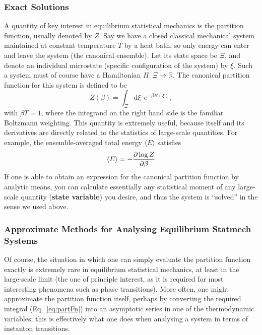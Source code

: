 \subsubsection{Exact Solutions}
A quantity of key interest in equilibrium statistical mechanics is the partition function, usually denoted by $Z$. Say we have a closed classical mechanical system maintained at constant temperature $T$ by a heat bath,
so only energy can enter and leave the system (the canonical ensemble). Let its state space be $\Xi$, and denote an individual microstate (specific configuration of the system) by $\xi$.
Such a system must of course have a Hamiltonian $H : \Xi \rightarrow \mathbb{R}$. The canonical partition function for this system is defined to be
\begin{equation} \label{eq:partFn}
 Z(\beta) = \int_\Xi  \! \! \mathrm{d}  \xi \  \  e^{- \beta H(\xi)},
\end{equation}
with $\beta T = 1$, where the integrand on the right hand side is the familiar Boltzmann weighting. This quantity is extremely useful, because itself and its derivatives are directly related to the statistics of large-scale quantities.
For example, the ensemble-averaged total energy $\langle E \rangle$ satisfies
\begin{equation}
 \langle E \rangle = - \frac{\partial \log{Z}}{\partial \beta}
\end{equation}
If one is able to obtain an expression for the canonical partition function by analytic means, you can calculate essentially any statistical moment of any large-scale quantity (\textbf{state variable})
you desire, and thus the system is ``solved'' in the sense we used above.



\subsubsection{Approximate Methods for Analysing Equilibrium Statmech Systems}
Of course, the situation in which one can simply evaluate the partition function exactly is
extremely rare in equilibrium statistical mechanics, at least in the large-scale limit (the one of
principle interest, as it is required for most interesting phenomena such as phase transitions).
More often, one might approximate the partition function itself, perhaps by converting the required
integral (Eq.~\ref{eq:partFn}) into an asymptotic series in one of the thermodynamic variables;
this is effectively what one does when analysing a system in terms of instanton transitions.

